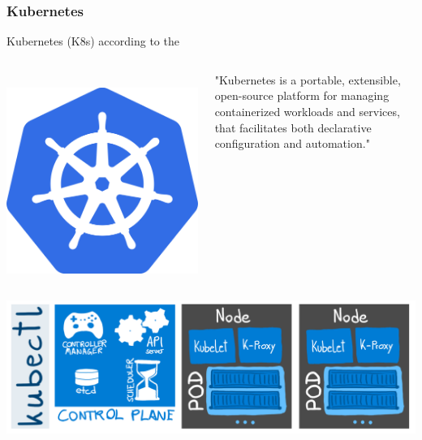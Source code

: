 \begin{frame}
	\frametitle{Kubernetes}
	\vspace{-.1cm}\begin{block}{Kubernetes (K8s) according to the }
		\begin{columns}
			\centering
			\vspace{.1cm}\\
			\includegraphics[width=.75\textwidth]{pics/kubernetes_logo.png}
			
			"Kubernetes is a portable, extensible, open-source platform for managing containerized workloads and services, that facilitates both declarative configuration and automation."
		\end{columns}
	\end{block}
	\centering
	\vspace{-.1cm}\includegraphics[width=\textwidth]{pics/kubernetes_sketch.png}
\end{frame}

